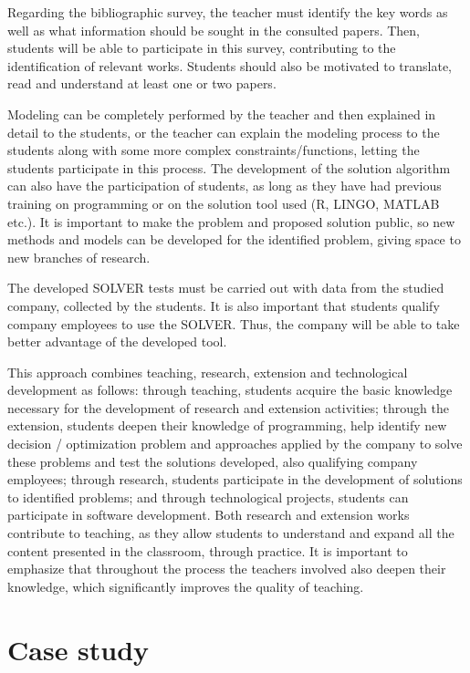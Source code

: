 \documentclass[preprint,12pt,authoryear]{elsarticle}
\begin{document}
Regarding the bibliographic survey, the teacher must identify the key words as well as what information should be sought in the consulted papers. Then, students will be able to participate in this survey, contributing to the identification of relevant works. Students should also be motivated to translate, read and understand at least one or two papers. 

Modeling can be completely performed by the teacher and then explained in detail to the students, or the teacher can explain the modeling process to the students along with some more complex constraints/functions, letting the students participate in this process. The development of the solution algorithm can also have the participation of students, as long as they have had previous training on programming or on the solution tool used (R, LINGO, MATLAB etc.). It is important to make the problem and proposed solution public, so new methods and models can be developed for the identified problem, giving space to new branches of research. 

The developed SOLVER tests must be carried out with data from the studied company, collected by the students. It is also important that students qualify company employees to use the SOLVER. Thus, the company will be able to take better advantage of the developed tool.

This approach combines teaching, research, extension and technological development as follows: through teaching, students acquire the basic knowledge necessary for the development of research and extension activities; through the extension, students deepen their knowledge of programming, help identify new decision / optimization problem and approaches applied by the company to solve these problems and test the solutions developed, also qualifying company employees; through research, students participate in the development of solutions to identified problems; and through technological projects, students can participate in software development. Both research and extension works contribute to teaching, as they allow students to understand and expand all the content
presented in the classroom, through practice. It is important to emphasize that throughout the process the teachers involved also deepen their knowledge, which significantly improves the quality of teaching.

\section{Case study}
\label{}
\end{document}
